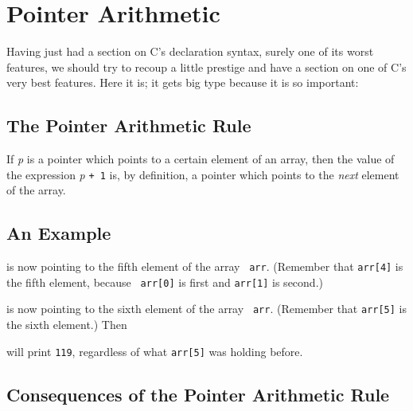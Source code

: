 \section{Pointer Arithmetic}

Having just had a section on C's declaration syntax, surely one of its
worst features, we should try to recoup a little prestige and have a
section on one of C's very best features.  Here it is; it gets big type
because it is so important:

\subsection{The Pointer Arithmetic Rule}

{\large If {\em p}\/ is a pointer which points to a certain element of
an array, then the value of the expression {\em p} {\tt + 1} is, by
definition, a pointer which points to the {\em next}\/ element of the
array.}

\subsection{An Example}

\begin{flushleft}
\verb% float arr[53], *p *q;% \\*
\verb% % \\*
\verb% p = &arr[4];% 
\end{flushleft}

 is now pointing to the fifth element of the array {\tt
arr}.  (Remember that {\tt arr[4]} is the fifth element, because {\tt
arr[0]} is first and {\tt arr[1]} is second.)

\begin{flushleft}
\verb% q = p + 1; % 
\end{flushleft}

 is now pointing to the sixth element of the array {\tt
arr}.  (Remember that {\tt arr[5]} is the sixth element.)  Then


\noindent will print {\tt 119}, regardless of what {\tt arr[5]} was
holding before.

\subsection{Consequences of the Pointer Arithmetic Rule}

